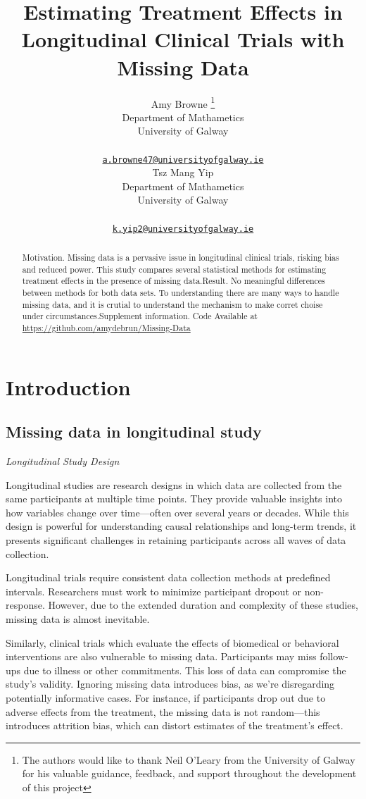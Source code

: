 \documentclass{article}
\title{Estimating Treatment Effects in Longitudinal Clinical Trials with
Missing Data}
\author{
    Amy Browne
    \thanks{The authors would like to thank Neil O'Leary from the
University of Galway for his valuable guidance, feedback, and support
throughout the development of this project}
   \\
    Department of Mathametics \\
    University of Galway \\
   \\
  \texttt{\href{mailto:a.browne47@universityofgalway.ie}{\nolinkurl{a.browne47@universityofgalway.ie}}} \\
   \And
    Tsz Mang Yip
   \\
    Department of Mathametics \\
    University of Galway \\
   \\
  \texttt{\href{mailto:k.yip2@universityofgalway.ie}{\nolinkurl{k.yip2@universityofgalway.ie}}} \\
  }
\begin{document}
\maketitle


\begin{abstract}
Motivation. Missing data is a pervasive issue in longitudinal clinical
trials, risking bias and reduced power. This study compares several
statistical methods for estimating treatment effects in the presence of
missing data.Result. No meaningful differences between methods for both
data sets. To understanding there are many ways to handle missing data,
and it is crutial to understand the mechanism to make corret choise
under circumstances.Supplement information. Code Available at
\url{https://github.com/amydebrun/Missing-Data}
\end{abstract}


\section{Introduction}\label{introduction}

\subsection{Missing data in longitudinal
study}\label{missing-data-in-longitudinal-study}

\emph{Longitudinal Study Design}

Longitudinal studies are research designs in which data are collected
from the same participants at multiple time points. They provide
valuable insights into how variables change over time---often over
several years or decades. While this design is powerful for
understanding causal relationships and long-term trends, it presents
significant challenges in retaining participants across all waves of
data collection.

Longitudinal trials require consistent data collection methods at
predefined intervals. Researchers must work to minimize participant
dropout or non-response. However, due to the extended duration and
complexity of these studies, missing data is almost inevitable.

Similarly, clinical trials which evaluate the effects of biomedical or
behavioral interventions are also vulnerable to missing data.
Participants may miss follow-ups due to illness or other commitments.
This loss of data can compromise the study's validity. Ignoring missing
data introduces bias, as we're disregarding potentially informative
cases. For instance, if participants drop out due to adverse effects
from the treatment, the missing data is not random---this introduces
attrition bias, which can distort estimates of the treatment's effect.
\end{document}

